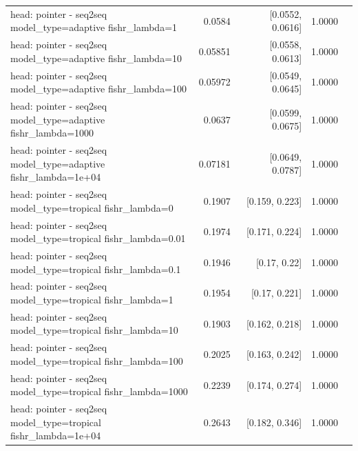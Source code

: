 \documentclass[10pt]{article}
\makeatletter
\newcommand{\stackcell}[1]{\begin{tabular}[t]{@{}l@{}}#1\end{tabular}}
\makeatother
\begin{document}
{\begin{longtable}{lrrrl}
\stackcell{head: pointer - seq2seq\\\footnotesize model\_type=adaptive fishr\_lambda=1 } & 0.0584 & [0.0552, 0.0616] & 1.0000 & \\
\stackcell{head: pointer - seq2seq\\\footnotesize model\_type=adaptive fishr\_lambda=10 } & 0.05851 & [0.0558, 0.0613] & 1.0000 & \\
\stackcell{head: pointer - seq2seq\\\footnotesize model\_type=adaptive fishr\_lambda=100 } & 0.05972 & [0.0549, 0.0645] & 1.0000 & \\
\stackcell{head: pointer - seq2seq\\\footnotesize model\_type=adaptive fishr\_lambda=1000 } & 0.0637 & [0.0599, 0.0675] & 1.0000 & \\
\stackcell{head: pointer - seq2seq\\\footnotesize model\_type=adaptive fishr\_lambda=1e+04 } & 0.07181 & [0.0649, 0.0787] & 1.0000 & \\
\stackcell{head: pointer - seq2seq\\\footnotesize model\_type=tropical fishr\_lambda=0 } & 0.1907 & [0.159, 0.223] & 1.0000 & \\
\stackcell{head: pointer - seq2seq\\\footnotesize model\_type=tropical fishr\_lambda=0.01 } & 0.1974 & [0.171, 0.224] & 1.0000 & \\
\stackcell{head: pointer - seq2seq\\\footnotesize model\_type=tropical fishr\_lambda=0.1 } & 0.1946 & [0.17, 0.22] & 1.0000 & \\
\stackcell{head: pointer - seq2seq\\\footnotesize model\_type=tropical fishr\_lambda=1 } & 0.1954 & [0.17, 0.221] & 1.0000 & \\
\stackcell{head: pointer - seq2seq\\\footnotesize model\_type=tropical fishr\_lambda=10 } & 0.1903 & [0.162, 0.218] & 1.0000 & \\
\stackcell{head: pointer - seq2seq\\\footnotesize model\_type=tropical fishr\_lambda=100 } & 0.2025 & [0.163, 0.242] & 1.0000 & \\
\stackcell{head: pointer - seq2seq\\\footnotesize model\_type=tropical fishr\_lambda=1000 } & 0.2239 & [0.174, 0.274] & 1.0000 & \\
\stackcell{head: pointer - seq2seq\\\footnotesize model\_type=tropical fishr\_lambda=1e+04 } & 0.2643 & [0.182, 0.346] & 1.0000 & \\

\end{longtable}}
\end{document}
